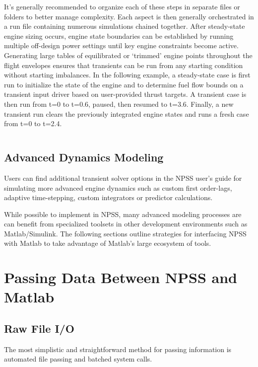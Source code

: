\documentclass[heading.tex]{subfiles}
\begin{document}
It's generally recommended to organize each of these steps in separate files or folders to better manage complexity.
Each aspect is then generally orchestrated in a run file containing numerous simulations chained together. 
After steady-state engine sizing occurs, engine state boundaries can be established by running multiple
off-design power settings until key engine constraints become active. Generating large tables of equilibrated or `trimmed' engine points
throughout the flight envelopes ensures that transients can be run from any starting condition without
starting imbalances.
In the following example, a steady-state case is first run to initialize the state of the engine and
to determine fuel flow bounds on a transient input driver based on user-provided thrust targets.
A transient case is then run from t=0 to t=0.6, paused, then resumed to t=3.6.
Finally, a new transient run clears the previously integrated engine states and runs a fresh case from t=0 to t=2.4.

 \begin{adjustwidth}{1cm}{-1cm}
 \inputminted[]{c++}{code/transientRun}
 \end{adjustwidth} 

\subsection{Advanced Dynamics Modeling}

Users can find additional transient solver options in the NPSS user's guide \cite[chap.~18]{NPSS} for simulating
more advanced engine dynamics such as custom first order-lags, adaptive time-stepping, custom integrators or
predictor calculations.

While possible to implement in NPSS, many advanced modeling processes are can benefit
from specialized toolsets in other development environments such as Matlab/Simulink.
The following sections outline strategies for interfacing NPSS with Matlab to take advantage of Matlab's large
ecosystem of tools.

\section{Passing Data Between NPSS and Matlab}
\subsection{Raw File I/O}

The most simplistic and straightforward method for passing information is automated
file passing and batched system calls.
\end{document}
